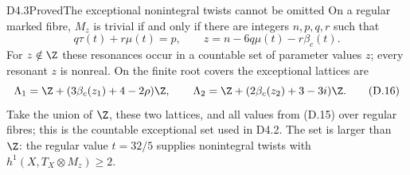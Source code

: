 \begin{claim}{D4.3}{Proved}{The exceptional nonintegral twists cannot be omitted}
On a regular marked fibre, $M_z$ is trivial if and only if there are
integers $n,p,q,r$ such that
\[
 q\tau(t)+r\mu(t)=p,\qquad
 z=n-6q\mu(t)-r\beta_c(t).                             \tag{D.15}
\]
For $z\notin\Z$ these resonances occur in a countable set of parameter
values $z$; every resonant $z$ is nonreal. On the finite root covers
the exceptional lattices are
\[
 \Lambda_1=\Z+(3\beta_c(z_1)+4-2\rho)\Z,\qquad
 \Lambda_2=\Z+(2\beta_c(z_2)+3-3i)\Z.                  \tag{D.16}
\]
Take the union of $\Z$, these two lattices, and all values from (D.15)
over regular fibres; this is the countable exceptional set used in
D4.2. The set is larger than $\Z$: the regular value $t=32/5$
supplies nonintegral twists with $h^1(X,T_X\otimes M_z)\ge2$.
\end{claim}
